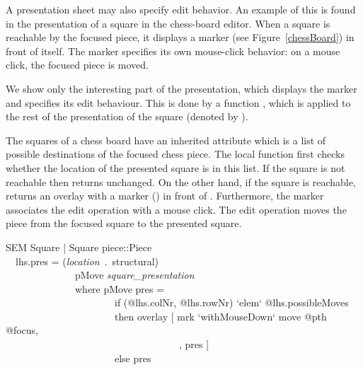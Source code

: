 {}

A presentation sheet may also specify edit behavior. An example of this is found in the presentation of a square in the chess-board editor. When a square is reachable by the focused piece, it displays a marker (see Figure~\ref{chessBoard}) in front of itself. The marker specifies its own mouse-click behavior: on a mouse click, the focused piece is moved. 

We show only the interesting part of the presentation, which displays the marker and specifies its edit behaviour. This is done by a function , which is applied to the rest of the presentation of the square (denoted by ).

The squares of a chess board have an inherited attribute  which is a list of possible destinations of the focused chess piece. The local function  first checks whether the location of the presented square  is in this list. If the square is not reachable then  returns   unchanged. On the other hand, if the square is reachable,  returns an overlay with a marker () in front of . Furthermore, the marker associates the edit operation  with a mouse click. The edit operation moves the piece from the focused square to the presented square.
 
\ttfamily\begin{small}\begin{tabbing}
SEM Square | Square piece::Piece\\
~~lhs.pres = ({\em location}~.~structural)\\
~~~~~~~~~~~~~~pMove {\em square\_presentation}\\
~~~~~~~~~~~~~~where pMove pres =\\
~~~~~~~~~~~~~~~~~~~~~~if (@lhs.colNr, @lhs.rowNr) `elem` @lhs.possibleMoves\\
~~~~~~~~~~~~~~~~~~~~~~then overlay [ mrk `withMouseDown` move @pth @focus,\\
~~~~~~~~~~~~~~~~~~~~~~~~~~~~~~~~~~~, pres ]\\
~~~~~~~~~~~~~~~~~~~~~~else pres\\
\end{tabbing}\end{small}\rmfamily

